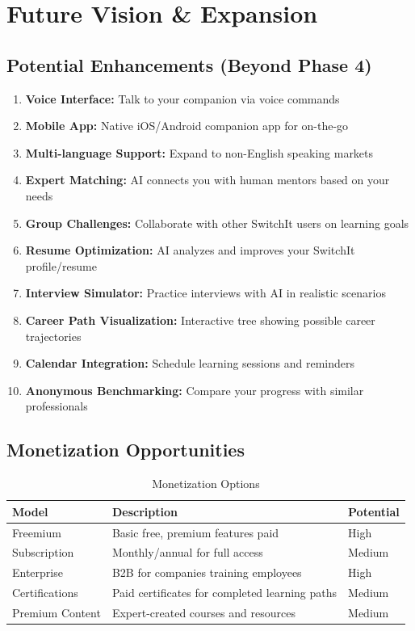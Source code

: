 \documentclass[12pt,a4paper]{article}
\begin{document}
\section{Future Vision \& Expansion}

\subsection{Potential Enhancements (Beyond Phase 4)}

\begin{enumerate}[leftmargin=*]
    \item \textbf{Voice Interface:} Talk to your companion via voice commands
    \item \textbf{Mobile App:} Native iOS/Android companion app for on-the-go
    \item \textbf{Multi-language Support:} Expand to non-English speaking markets
    \item \textbf{Expert Matching:} AI connects you with human mentors based on your needs
    \item \textbf{Group Challenges:} Collaborate with other SwitchIt users on learning goals
    \item \textbf{Resume Optimization:} AI analyzes and improves your SwitchIt profile/resume
    \item \textbf{Interview Simulator:} Practice interviews with AI in realistic scenarios
    \item \textbf{Career Path Visualization:} Interactive tree showing possible career trajectories
    \item \textbf{Calendar Integration:} Schedule learning sessions and reminders
    \item \textbf{Anonymous Benchmarking:} Compare your progress with similar professionals
\end{enumerate}

\subsection{Monetization Opportunities}

\begin{table}[h]
\centering
\begin{tabularx}{\textwidth}{|l|X|l|}
\hline
\textbf{Model} & \textbf{Description} & \textbf{Potential} \\
\hline
Freemium & Basic free, premium features paid & High \\
\hline
Subscription & Monthly/annual for full access & Medium \\
\hline
Enterprise & B2B for companies training employees & High \\
\hline
Certifications & Paid certificates for completed learning paths & Medium \\
\hline
Premium Content & Expert-created courses and resources & Medium \\
\hline
\end{tabularx}
\caption{Monetization Options}
\end{table}
\end{document}
